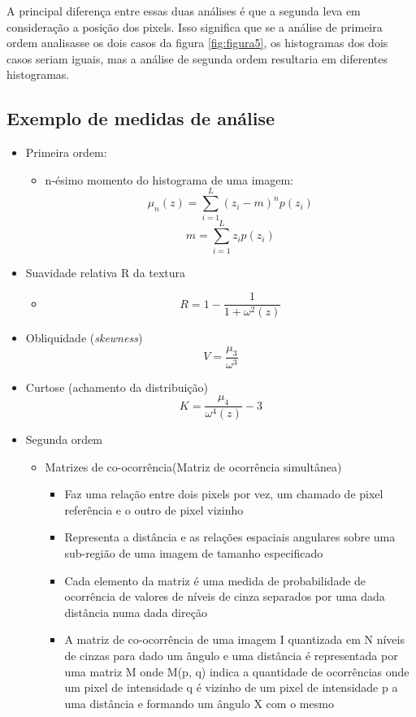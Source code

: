 \documentclass{article}
\begin{document}
A principal diferença entre essas duas análises é que a segunda leva em consideração a posição dos pixels. Isso significa que se a análise de primeira ordem analisasse os dois casos da figura \ref{fig:figura5}, os histogramas dos dois casos seriam iguais, mas a análise de segunda ordem resultaria em diferentes histogramas.

\subsection{Exemplo de medidas de análise}
\begin{itemize}
    \item Primeira ordem:
    \begin{itemize}
        \item n-ésimo momento do histograma de uma imagem:
        $$ \mu _{n}(z)=\sum_{i=1}^{L} (z_{i}-m)^n p(z_{i})$$
        $$m=\sum_{i=1}^{L}z_{i}p(z_{i})$$
    \end{itemize}
    \item Suavidade relativa R da textura
    \begin{itemize}
        \item $$R=1-\frac{1}{1+\omega^2(z)}$$
    \end{itemize}
    \item Obliquidade (\textit{skewness})
    $$V=\frac{\mu_{3}}{\omega^3}$$
    \item Curtose (achamento da distribuição)
    $$K=\frac{\mu_{4}}{\omega^4(z)}-3$$
    \item Segunda ordem
    \begin{itemize}
        \item Matrizes de co-ocorrência(Matriz de ocorrência simultânea)
        \begin{itemize}
            \item Faz uma relação entre dois pixels por vez, um chamado de pixel referência e o outro de pixel vizinho
            \item Representa a distância e as relações espaciais angulares sobre uma sub-região de uma imagem de tamanho especificado
            \item Cada elemento da matriz é uma medida de probabilidade de ocorrência de valores de níveis de cinza separados por uma dada distância numa dada direção 
            \item A matriz de co-ocorrência de uma imagem I quantizada em N níveis de cinzas para dado um ângulo e uma distância é representada por uma matriz M onde M(p, q) indica a quantidade de ocorrências onde um pixel de intensidade q é vizinho de um pixel de intensidade p a uma distância e formando um ângulo X com o mesmo
        \end{itemize}
        

\end{itemize}
\end{itemize}
\end{document}
